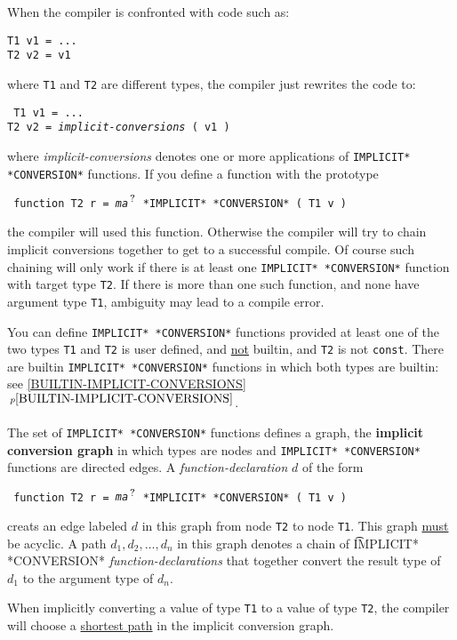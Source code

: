\documentclass[12pt]{article}
\newcommand{\QMARK}{{$^{\,\mbox{\footnotesize ?}}$}}
\newcommand{\key}[1]{{\rm \bfseries #1}}
\newcommand{\itemref}[1]{\ref{#1}$\,^{p\pageref{#1}}$}
\newenvironment{indpar}[1][0.3in]%
	{\begin{list}{}%
		     {\setlength{\itemsep}{0in}%
		      \setlength{\topsep}{0in}%
		      \setlength{\parsep}{1ex}%
		      \setlength{\labelwidth}{#1}%
		      \setlength{\leftmargin}{#1}%
		      \addtolength{\leftmargin}{\labelsep}}%
	 \item}%
	{\end{list}}
\begin{document}
When the compiler is confronted with code such as:
\begin{indpar}\begin{verbatim}
T1 v1 = ...
T2 v2 = v1
\end{verbatim}\end{indpar}
where {\tt T1} and {\tt T2} are different types,
the compiler just rewrites the code to:
\begin{indpar}\tt
T1 v1 = ... \\
T2 v2 = {\rm \em implicit-conversions} ( v1 )
\end{indpar}
where {\em implicit-conversions} denotes one or more applications
of {\tt *IMPLICIT* *CONVERSION*} functions.
If you define a function
with the prototype
\begin{indpar} \tt
function T2 r = {\em ma}\QMARK{} *IMPLICIT* *CONVERSION* ( T1 v )
\end{indpar}
the compiler will used this function.  Otherwise the compiler
will try to chain implicit conversions together to get to a
successful compile.  Of course such chaining will only work
if there is at least one {\tt *IMPLICIT* *CONVERSION*} function with
target type {\tt T2}.  If there is more than one such function,
and none have argument type {\tt T1}, ambiguity may lead to a compile error.

You can define {\tt *IMPLICIT* *CONVERSION*} functions
provided at least one of the two types {\tt T1} and {\tt T2}
is user defined, and \underline{not} builtin, and {\tt T2} is not {\tt const}.
There are builtin {\tt *IMPLICIT* *CON\-VER\-SION*} functions in
which both types are builtin: see \itemref{BUILTIN-IMPLICIT-CONVERSIONS}.

The set of {\tt *IMPLICIT* *CONVERSION*} functions defines
a graph, the \key{implicit conversion graph}\label{IMPLICIT-CONVERSION-GRAPH}
in which types are nodes and {\tt *IMPLICIT* *CONVERSION*}
functions are directed edges.
A {\em function-declaration} $d$ of the form
\begin{indpar} \tt
function T2 r = {\em ma}\QMARK{} *IMPLICIT* *CONVERSION* ( T1 v )
\end{indpar}
creats an edge labeled $d$ in this graph from node {\tt T2} to node
{\tt T1}.
This graph \underline{must} be
acyclic.  A path $d_1,d_2,\ldots,d_n$ in this graph denotes a chain
of {\t *IMPLICIT* *CONVERSION*} {\em function-declarations} that together
convert the result type of $d_1$ to the argument type of $d_n$.

When implicitly converting a value of type {\tt T1} to a value of
type {\tt T2}, the compiler will choose a \underline{shortest path}
in the implicit conversion graph.
\end{document}

